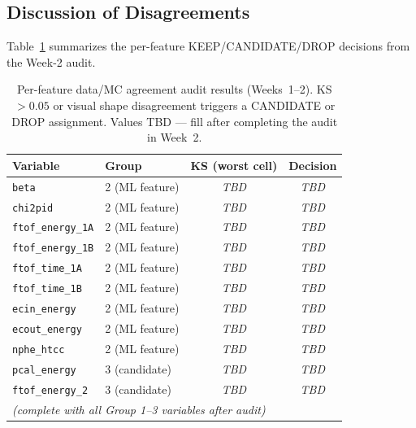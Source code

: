 \documentclass[11pt]{article}
\begin{document}
\subsection{Discussion of Disagreements}

Table~\ref{tab:feature_audit} summarizes the per-feature KEEP/CANDIDATE/DROP
decisions from the Week-2 audit.

\begin{table}[h]
  \centering
  \caption{Per-feature data/MC agreement audit results (Weeks~1--2).
           KS$>0.05$ or visual shape disagreement triggers a CANDIDATE or DROP
           assignment.
           Values TBD --- fill after completing the audit in Week~2.}
  \label{tab:feature_audit}
  \begin{tabular}{llcc}
    \toprule
    Variable & Group & KS (worst cell) & Decision \\
    \midrule
    \texttt{beta}           & 2 (ML feature)     & \textit{TBD} & \textit{TBD} \\
    \texttt{chi2pid}        & 2 (ML feature)     & \textit{TBD} & \textit{TBD} \\
    \texttt{ftof\_energy\_1A} & 2 (ML feature)   & \textit{TBD} & \textit{TBD} \\
    \texttt{ftof\_energy\_1B} & 2 (ML feature)   & \textit{TBD} & \textit{TBD} \\
    \texttt{ftof\_time\_1A}   & 2 (ML feature)   & \textit{TBD} & \textit{TBD} \\
    \texttt{ftof\_time\_1B}   & 2 (ML feature)   & \textit{TBD} & \textit{TBD} \\
    \texttt{ecin\_energy}   & 2 (ML feature)     & \textit{TBD} & \textit{TBD} \\
    \texttt{ecout\_energy}  & 2 (ML feature)     & \textit{TBD} & \textit{TBD} \\
    \texttt{nphe\_htcc}     & 2 (ML feature)     & \textit{TBD} & \textit{TBD} \\
    \texttt{pcal\_energy}   & 3 (candidate)      & \textit{TBD} & \textit{TBD} \\
    \texttt{ftof\_energy\_2} & 3 (candidate)     & \textit{TBD} & \textit{TBD} \\
    \midrule
    \multicolumn{4}{l}{\textit{(complete with all Group 1--3 variables after audit)}} \\
    \bottomrule
  \end{tabular}
\end{table}
\end{document}
